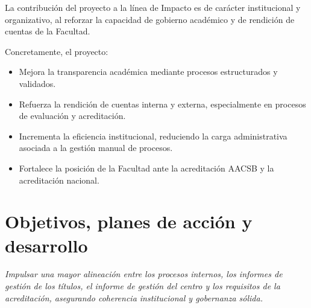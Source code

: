 \documentclass[11pt,a4paper]{scrreprt}
\begin{document}
La contribución del proyecto a la línea de Impacto es de carácter institucional y organizativo, al reforzar la capacidad de gobierno académico y de rendición de cuentas de la Facultad. 

Concretamente, el proyecto: 

\begin{itemize}[noitemsep,topsep=2pt]
\item Mejora la transparencia académica mediante procesos estructurados y validados. 

\item Refuerza la rendición de cuentas interna y externa, especialmente en procesos de evaluación y acreditación. 

\item Incrementa la eficiencia institucional, reduciendo la carga administrativa asociada a la gestión manual de procesos. 

\item Fortalece la posición de la Facultad ante la acreditación AACSB y la acreditación nacional. 
\end{itemize}

\section{Objetivos, planes de acción y desarrollo}
\newpage
{}
{\small\color{mutedcolor}\itshape Impulsar una mayor alineación entre los procesos internos, los informes de gestión de los títulos, el informe de gestión del centro y los requisitos de la acreditación, asegurando coherencia institucional y gobernanza sólida.}\par\vspace{6pt}
\end{document}
